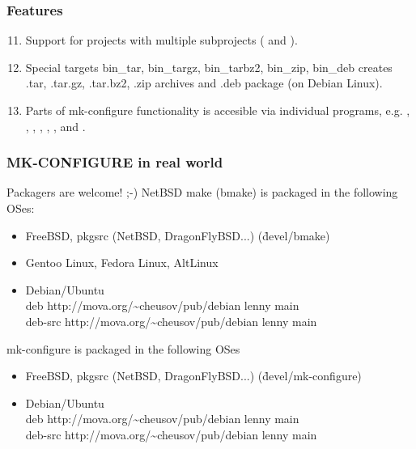 \documentclass[hyperref={colorlinks=true}]{beamer}
\begin{document}

\begin{frame}[fragile,t]
  \frametitle{Features}
  \begin{block}{}
  \begin{enumerate}
    \setcounter{enumi}{10}
    \item Support for projects with multiple subprojects
    ( and ).
    \item Special targets bin\_tar, bin\_targz, bin\_tarbz2, bin\_zip,
      bin\_deb creates .tar, .tar.gz, .tar.bz2, .zip archives and .deb
      package (on Debian Linux).
    \item Parts of mk-configure functionality is
      accesible via individual programs, e.g.  ,
      ,
      , ,
      ,
      ,  and
      .
  \end{enumerate}
  \end{block}
\end{frame}


\begin{frame}[fragile,t]
  \frametitle{MK-CONFIGURE in real world}
  \begin{block}{Packagers are welcome! ;-)}
    \small
    NetBSD make (bmake) is packaged in the following OSes:
    \begin{itemize}
    \item FreeBSD, pkgsrc (NetBSD, DragonFlyBSD...) (\h{devel/bmake})
    \item Gentoo Linux, Fedora Linux, AltLinux
    \item Debian/Ubuntu\\
      deb http://mova.org/\~{}cheusov/pub/debian lenny main\\
      deb-src http://mova.org/\~{}cheusov/pub/debian lenny main
    \end{itemize}
    mk-configure is packaged in the following OSes
    \begin{itemize}
    \item FreeBSD, pkgsrc (NetBSD, DragonFlyBSD...) (\h{devel/mk-configure})
    \item Debian/Ubuntu\\
      deb http://mova.org/\~{}cheusov/pub/debian lenny main\\
      deb-src http://mova.org/\~{}cheusov/pub/debian lenny main
    \end{itemize}
  \end{block}
\end{frame}
\end{document}
